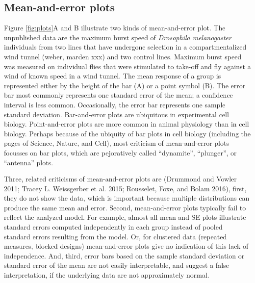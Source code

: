 \documentclass[fleqn,10pt,lineno]{wlpeerj} %
\theoremstyle{definition}
\theoremstyle{definition}
\theoremstyle{definition}
\theoremstyle{remark}
\begin{document}
\subsection*{Mean-and-error plots}\label{mean-and-error-plots}

Figure \ref{fig:plots}A and B illustrate two kinds of mean-and-error
plot. The unpublished data are the maximum burst speed of
\emph{Drosophila melanogaster} individuals from two lines that have
undergone selection in a compartmentalized wind tunnel (weber, marden
xxx) and two control lines. Maximum burst speed was measured on
individual flies that were stimulated to take-off and fly against a wind
of known speed in a wind tunnel. The mean response of a group is
represented either by the height of the bar (A) or a point symbol (B).
The error bar most commonly represents one standard error of the mean; a
confidence interval is less common. Occasionally, the error bar
represents one sample standard deviation. Bar-and-error plots are
ubiquitous in experimental cell biology. Point-and-error plots are more
common in animal physiology than in cell biology. Perhaps because of the
ubiquity of bar plots in cell biology (including the pages of Science,
Nature, and Cell), most criticism of mean-and-error plots focusses on
bar plots, which are pejoratively called ``dynamite'', ``plunger'', or
``antenna'' plots.

Three, related criticisms of mean-and-error plots are (Drummond and
Vowler 2011; Tracey L. Weissgerber et al. 2015; Rousselet, Foxe, and
Bolam 2016), first, they do not show the data, which is important
because multiple distributions can produce the same mean and error.
Second, mean-and-error plots typically fail to reflect the analyzed
model. For example, almost all mean-and-SE plots illustrate standard
errors computed independently in each group instead of pooled standard
errors resulting from the model. Or, for clustered data (repeated
measures, blocked designs) mean-and-error plots give no indication of
this lack of independence. And, third, error bars based on the sample
standard deviation or standard error of the mean are not easily
interpretable, and suggest a false interpretation, if the underlying
data are not approximately normal.
\end{document}
